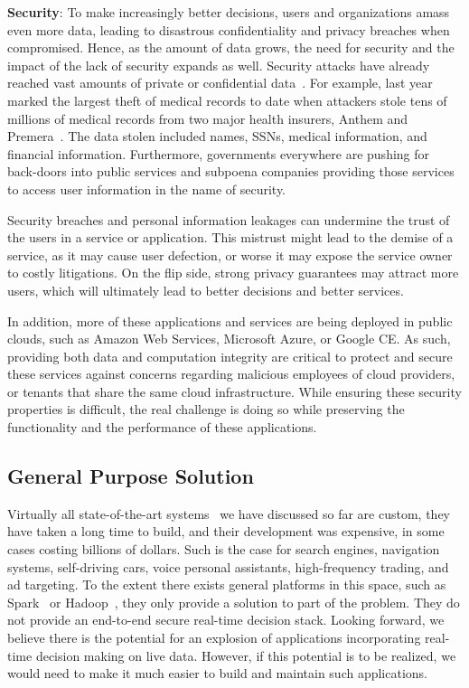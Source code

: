 {\bf Security}: To make increasingly better decisions, users and organizations amass even more data, leading to  disastrous confidentiality and privacy breaches when compromised. Hence, as the amount of data grows, the need for security and the impact of the lack of security expands as well. Security attacks have already reached vast amounts of private or confidential data~\cite{breaches2015}. For example, last year marked the largest theft of medical records to date when attackers stole tens of millions of medical records from two major health insurers, Anthem and Premera~\cite{AnthemBreach,AnthemLargest}. 
The data stolen included names, SSNs, medical information, and financial information. Furthermore, governments everywhere are pushing for back-doors into public services and subpoena companies providing those services to access user information in the name of security. 

Security breaches and personal information leakages can undermine the trust of the users in a service or application. This mistrust might lead to the demise of a service, as it may cause user defection, or worse it may expose the service owner to costly litigations. On the flip side, strong privacy guarantees may attract more users, which will ultimately lead to better decisions and better services. 

In addition, more of these applications and services are being deployed in public clouds, such as Amazon Web Services, Microsoft Azure, or Google CE. As such, providing both data and computation integrity are critical to protect and secure these services against concerns regarding malicious employees of cloud providers, or tenants that share the same cloud infrastructure. While ensuring these security properties is difficult, the real challenge is doing so while preserving the functionality and the performance of these applications.

\subsection{General Purpose Solution}

Virtually all state-of-the-art systems~\cite{Agarwal14, Graepel10, Ganjam15}  we have discussed so far are custom, they have taken a long time to build, and their development was expensive, in some cases costing billions of dollars. Such is the case for search engines, navigation systems, self-driving cars, voice personal assistants, high-frequency trading, and ad targeting. To the extent there exists general platforms in this space, such as Spark~\cite{spark} or Hadoop~\cite{murthy2011architecture}, they only provide a solution to part of the problem. They do not  provide an end-to-end secure real-time decision stack. Looking forward, we believe there is the potential for an explosion of applications incorporating real-time decision making on live data. However, if this potential is to be realized, we would need to make it much easier to build and maintain such applications. 

